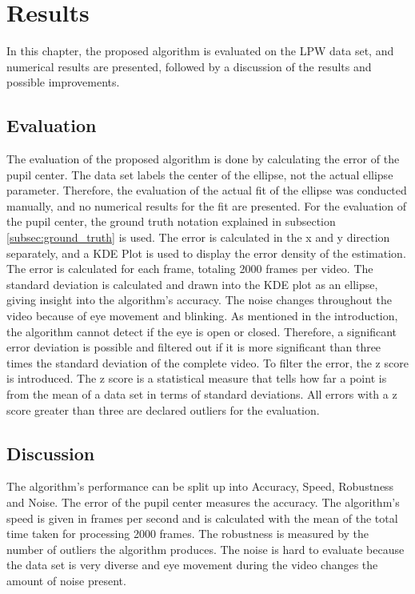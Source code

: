 \chapter{Results}
In this chapter, the proposed algorithm is evaluated on the LPW data set, and numerical results are presented, followed by a discussion of the results and possible improvements.
\section{Evaluation}
The evaluation of the proposed algorithm is done by calculating the error of the pupil center. The data set labels the center of the ellipse, not the actual ellipse parameter. Therefore, the evaluation of the actual fit of the ellipse was conducted manually, and no numerical results for the fit are presented. For the evaluation of the pupil center, the ground truth notation explained in subsection \ref{subsec:ground_truth} is used. The error is calculated in the x and y direction separately, and a KDE Plot is used to display the error density of the estimation. The error is calculated for each frame, totaling 2000 frames per video. The standard deviation is calculated and drawn into the KDE plot as an ellipse, giving insight into the algorithm's accuracy. The noise changes throughout the video because of eye movement and blinking. As mentioned in the introduction, the algorithm cannot detect if the eye is open or closed. Therefore, a significant error deviation is possible and filtered out if it is more significant than three times the standard deviation of the complete video. To filter the error, the z score is introduced. The z score is a statistical measure that tells how far a point is from the mean of a data set in terms of standard deviations. All errors with a z score greater than three are declared outliers for the evaluation. 

\section{Discussion}
The algorithm's performance can be split up into Accuracy, Speed, Robustness and Noise. The error of the pupil center measures the accuracy. The algorithm's speed is given in frames per second and is calculated with the mean of the total time taken for processing 2000 frames. The robustness is measured by the number of outliers the algorithm produces. The noise is hard to evaluate because the data set is very diverse and eye movement during the video changes the amount of noise present.
